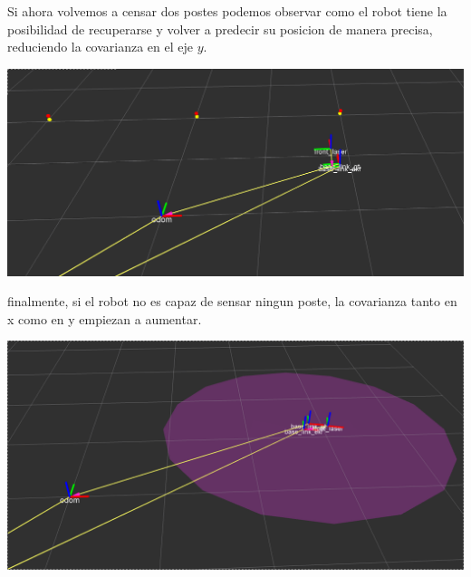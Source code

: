 Si ahora volvemos a censar dos postes podemos observar como el robot tiene la posibilidad de recuperarse y volver a predecir su posicion de manera precisa, reduciendo la covarianza en el eje $y$.

\includegraphics[scale=0.3]{punto4/ekfViendoTresPostesOtraVez.png}

finalmente, si el robot no es capaz de sensar ningun poste, la covarianza tanto en x como en y empiezan a aumentar.

\includegraphics[scale=0.3]{punto4/ekfSinVerNingunPoste.png}

